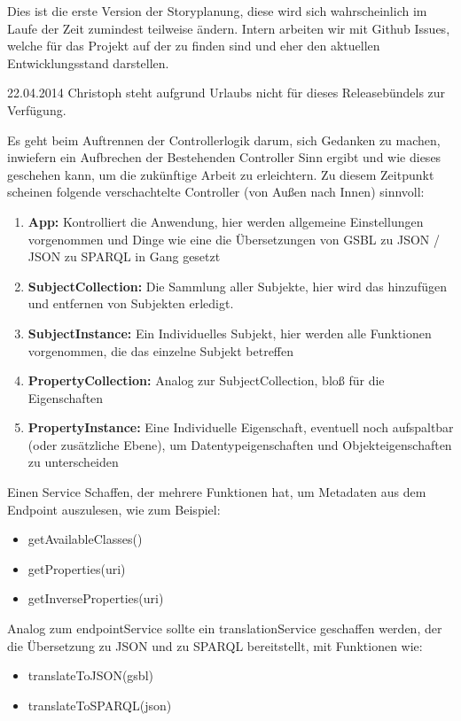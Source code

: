 Dies ist die erste Version der Storyplanung, diese wird sich wahrscheinlich im Laufe der Zeit zumindest teilweise ändern. Intern arbeiten wir mit Github Issues, welche für das Projekt auf der  zu finden sind und eher den aktuellen Entwicklungsstand darstellen.

\begin{release}{22.04.2014}
Christoph steht aufgrund Urlaubs nicht für dieses Releasebündels zur Verfügung.

%
Es geht beim Auftrennen der Controllerlogik darum, sich Gedanken zu machen, inwiefern ein Aufbrechen der Bestehenden Controller Sinn ergibt und wie dieses geschehen kann, um die zukünftige Arbeit zu erleichtern. Zu diesem Zeitpunkt scheinen folgende verschachtelte Controller (von Außen nach Innen) sinnvoll:
\begin{enumerate}
\item \textbf{App:} Kontrolliert die Anwendung, hier werden allgemeine Einstellungen vorgenommen und Dinge wie eine die Übersetzungen von GSBL zu JSON / JSON zu SPARQL in Gang gesetzt
\item\textbf{SubjectCollection:} Die Sammlung aller Subjekte, hier wird das hinzufügen und entfernen von Subjekten erledigt.
\item\textbf{SubjectInstance:} Ein Individuelles Subjekt, hier werden alle Funktionen vorgenommen, die das einzelne Subjekt betreffen
\item\textbf{PropertyCollection:} Analog zur SubjectCollection, bloß für die Eigenschaften
\item\textbf{PropertyInstance:} Eine Individuelle Eigenschaft, eventuell noch aufspaltbar (oder zusätzliche Ebene), um Datentypeigenschaften und Objekteigenschaften zu unterscheiden
\end{enumerate}

%
Einen Service Schaffen, der mehrere Funktionen hat, um Metadaten aus dem Endpoint auszulesen, wie zum Beispiel:
\begin{itemize}
\item getAvailableClasses()
\item getProperties(uri) 
\item getInverseProperties(uri)
\end{itemize}

%
Analog zum endpointService sollte ein translationService geschaffen werden, der die Übersetzung zu JSON und zu SPARQL bereitstellt, mit Funktionen wie:
\begin{itemize}
\item translateToJSON(gsbl)
\item translateToSPARQL(json)
\end{itemize}


\end{release}
